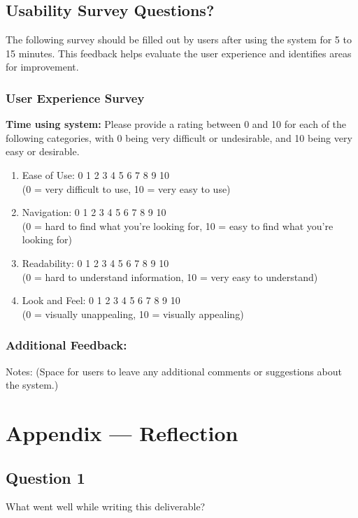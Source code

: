 \documentclass[12pt, titlepage]{article}
\begin{document}
\subsection{Usability Survey Questions?}

The following survey should be filled out by users after using the system for 5 to 15 minutes. This feedback helps evaluate the user experience and identifies areas for improvement.

\subsubsection{User Experience Survey}

\textbf{Time using system:}
Please provide a rating between 0 and 10 for each of the following categories, with 0 being very difficult or undesirable, and 10 being very easy or desirable.
\begin{enumerate}
  \item Ease of Use: 0 1 2 3 4 5 6 7 8 9 10 \\
    (0 = very difficult to use, 10 = very easy to use)
  \item Navigation: 0 1 2 3 4 5 6 7 8 9 10 \\
    (0 = hard to find what you’re looking for, 10 = easy to find what you’re looking for)
  \item Readability: 0 1 2 3 4 5 6 7 8 9 10 \\
    (0 = hard to understand information, 10 = very easy to understand)
  \item Look and Feel: 0 1 2 3 4 5 6 7 8 9 10 \\
    (0 = visually unappealing, 10 = visually appealing)
\end{enumerate}

\subsubsection{Additional Feedback:}
Notes: (Space for users to leave any additional comments or suggestions about the system.)

\newpage{}
\section*{Appendix --- Reflection}

\subsection{Question 1}
What went well while writing this deliverable?
\end{document}
